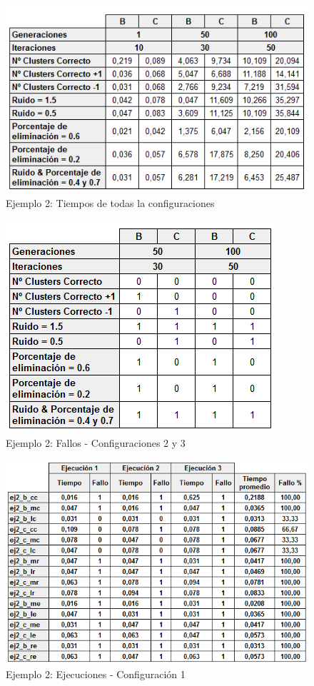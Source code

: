 \documentclass[conference,a4paper]{IEEEtran}
\begin{document}
\begin{figure}[H]
\centering
\includegraphics[scale=0.6]{Experimentacion/Ejemplo2/Ejemplo2Completo}
\caption{Ejemplo 2: Tiempos de todas la configuraciones\\}
\end{figure}

\begin{figure}[H]
\centering
\includegraphics[scale=0.7]{Experimentacion/Ejemplo2/Ejemplo2Fallos}
\caption{Ejemplo 2: Fallos - Configuraciones 2 y 3\\}
\end{figure}

\begin{figure}[H]
\centering
\includegraphics[scale=0.5]{Experimentacion/Ejemplo2/Ejemplo2Ejecuciones}
\caption{Ejemplo 2: Ejecuciones - Configuración 1\\}
\end{figure}
\end{document}
